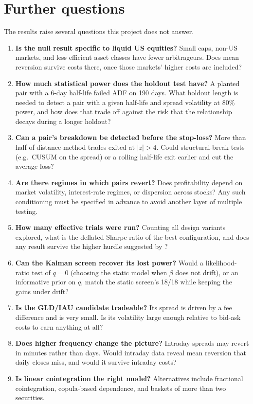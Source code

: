 \documentclass[11pt]{article}
\begin{document}
\section{Further questions}

The results raise several questions this project does not answer.

\begin{enumerate}
  \item \textbf{Is the null result specific to liquid US equities?} Small caps, non-US markets,
        and less efficient asset classes have fewer arbitrageurs. Does mean reversion survive
        costs there, once those markets' higher costs are included?
  \item \textbf{How much statistical power does the holdout test have?} A planted pair with a
        6-day half-life failed ADF on 190 days. What holdout length is needed to detect a pair
        with a given half-life and spread volatility at 80\% power, and how does that trade off
        against the risk that the relationship decays during a longer holdout?
  \item \textbf{Can a pair's breakdown be detected before the stop-loss?} More than half of
        distance-method trades exited at $|z|>4$. Could structural-break tests (e.g.\ CUSUM on
        the spread) or a rolling half-life exit earlier and cut the average loss?
  \item \textbf{Are there regimes in which pairs revert?} Does profitability depend on market
        volatility, interest-rate regimes, or dispersion across stocks? Any such conditioning
        must be specified in advance to avoid another layer of multiple testing.
  \item \textbf{How many effective trials were run?} Counting all design variants explored,
        what is the deflated Sharpe ratio \citep{bailey2014} of the best configuration, and
        does any result survive the higher hurdle suggested by \citet{harvey2016}?
  \item \textbf{Can the Kalman screen recover its lost power?} Would a likelihood-ratio test of
        $q=0$ (choosing the static model when $\beta$ does not drift), or an informative prior
        on $q$, match the static screen's 18/18 while keeping the gains under drift?
  \item \textbf{Is the GLD/IAU candidate tradeable?} Its spread is driven by a fee difference
        and is very small. Is its volatility large enough relative to bid-ask costs to earn
        anything at all?
  \item \textbf{Does higher frequency change the picture?} Intraday spreads may revert in
        minutes rather than days. Would intraday data reveal mean reversion that daily closes
        miss, and would it survive intraday costs?
  \item \textbf{Is linear cointegration the right model?} Alternatives include fractional
        cointegration, copula-based dependence, and baskets of more than two securities.
\end{enumerate}
\end{document}
